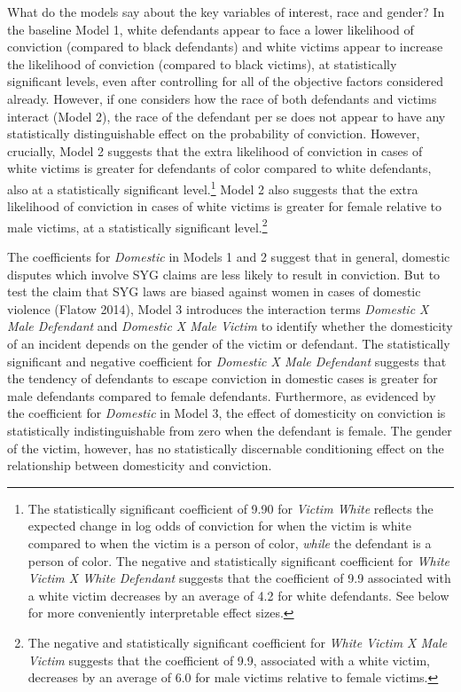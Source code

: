 \documentclass[12pt,article]{article}
\begin{document}
What do the models say about the key variables of interest, race and
gender? In the baseline Model 1, white defendants appear to face a lower likelihood of conviction (compared to black
defendants) and white victims appear to increase the likelihood of
conviction (compared to black victims), at statistically significant levels, even after controlling for all
of the objective factors considered already. However, if one considers
how the race of both defendants and victims interact (Model 2), the race
of the defendant per se does not appear to have any statistically distinguishable effect
on the probability of conviction. However, crucially, Model 2 suggests
that the extra likelihood of conviction in cases of white victims is greater for defendants of color compared to white
defendants, also at a statistically significant level.\footnote{The statistically significant coefficient of 9.90
  for \emph{Victim White} reflects the expected change in log odds of
  conviction for when the victim is white compared to when the victim is
  a person of color, \emph{while} the defendant is a person of color.
  The negative and statistically significant coefficient for \emph{White Victim X
  White Defendant} suggests that the coefficient of 9.9 associated with
  a white victim decreases by an average of 4.2 for white defendants.
  See below for more conveniently interpretable effect sizes.} Model 2
also suggests that the extra likelihood of conviction in cases of white
victims is greater for female relative to male
victims, at a statistically significant level.\footnote{The negative and statistically significant coefficient for
  \emph{White Victim X Male Victim} suggests that the coefficient of 9.9, 
  associated with a white victim, decreases by an average of 6.0 for male
  victims relative to female victims.}

The coefficients for \emph{Domestic} in Models 1 and 2 suggest that in
general, domestic disputes which involve SYG claims are less likely to
result in conviction. But to test the claim that SYG laws are biased
against women in cases of domestic violence (Flatow 2014), Model 3
introduces the interaction terms \emph{Domestic X Male Defendant} and
\emph{Domestic X Male Victim} to identify whether the domesticity of an
incident depends on the gender of the victim or defendant. The
statistically significant and negative coefficient for \emph{Domestic X
Male Defendant} suggests that the tendency of defendants to escape
conviction in domestic cases is greater for male
defendants compared to female defendants. Furthermore, as evidenced by
the coefficient for \emph{Domestic} in Model 3, the effect of
domesticity on conviction is statistically indistinguishable from zero
when the defendant is female. The gender of the victim, however, has no
statistically discernable conditioning effect on the relationship between domesticity
and conviction.
\end{document}
